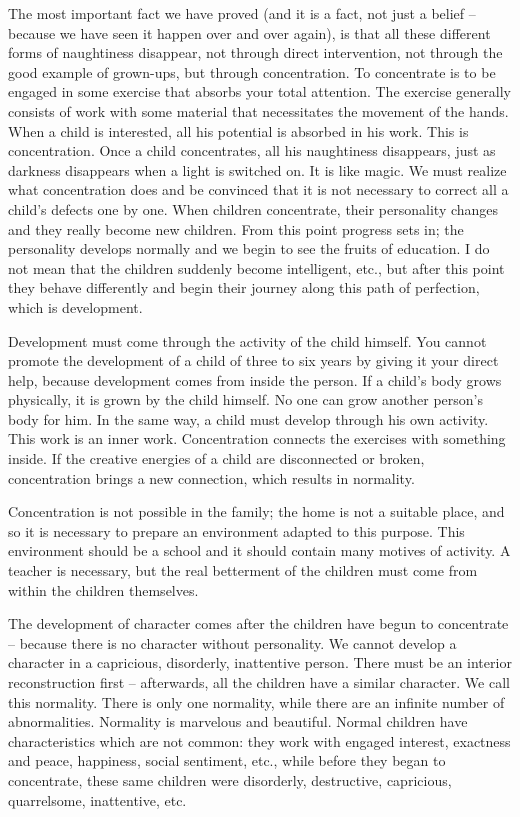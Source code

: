 \documentclass[lang=cn,10pt]{elegantbook}
\begin{document}
The most important fact we have proved (and it is a fact, not
just a belief – because we have seen it happen over and over again),
is that all these different forms of naughtiness disappear, not through
direct intervention, not through the good example of grown-ups, but
through concentration. To concentrate is to be engaged in some
exercise that absorbs your total attention. The exercise generally
consists of work with some material that necessitates the movement
of the hands. When a child is interested, all his potential is absorbed
in his work. This is concentration. Once a child concentrates, all his
naughtiness disappears, just as darkness disappears when a light is
switched on. It is like magic. We must realize what concentration
does and be convinced that it is not necessary to correct all a child’s
defects one by one. When children concentrate, their personality
changes and they really become new children. From this point
progress sets in; the personality develops normally and we begin to
see the fruits of education. I do not mean that the children suddenly
become intelligent, etc., but after this point they behave differently
and begin their journey along this path of perfection, which is
development.

Development must come through the activity of the child
himself. You cannot promote the development of a child of three to
six years by giving it your direct help, because development comes
from inside the person. If a child’s body grows physically, it is grown
by the child himself. No one can grow another person’s body for him.
In the same way, a child must develop through his own activity. This
work is an inner work. Concentration connects the exercises with
something inside. If the creative energies of a child are disconnected
or broken, concentration brings a new connection, which results in
normality.

Concentration is not possible in the family; the home is not a
suitable place, and so it is necessary to prepare an environment
adapted to this purpose. This environment should be a school and it
should contain many motives of activity. A teacher is necessary, but
the real betterment of the children must come from within the
children themselves.

The development of character comes after the children have
begun to concentrate – because there is no character without
personality. We cannot develop a character in a capricious,
disorderly, inattentive person. There must be an interior
reconstruction first – afterwards, all the children have a similar
character. We call this normality. There is only one normality, while
there are an infinite number of abnormalities. Normality is marvelous
and beautiful. Normal children have characteristics which are not
common: they work with engaged interest, exactness and peace,
happiness, social sentiment, etc., while before they began to
concentrate, these same children were disorderly, destructive,
capricious, quarrelsome, inattentive, etc.
\end{document}
